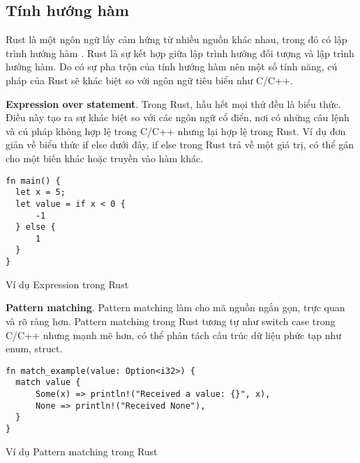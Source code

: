 \subsection{Tính hướng hàm}

Rust là một ngôn ngữ lấy cảm hứng từ nhiều nguồn khác nhau, trong đó có lập trình hướng hàm \cite{hughes1989functional}.
Rust là sự kết hợp giữa lập trình hướng đối tượng và lập trình hướng hàm.
Do có sự pha trộn của tính hướng hàm nên một số tính năng, cú pháp của Rust sẽ khác biệt so với ngôn ngữ tiêu biểu như C/C++.

\textbf{Expression over statement}.
Trong Rust, hầu hết mọi thứ đều là biểu thức.
Điều này tạo ra sự khác biệt so với các ngôn ngữ cổ điển, nơi có những câu lệnh và cú pháp không hợp lệ trong C/C++ nhưng lại hợp lệ trong Rust.
Ví dụ đơn giản về biểu thức if else dưới đây, if else trong Rust trả về một giá trị, có thể gán cho một biến khác hoặc truyền vào hàm khác.

\begin{listing}[H]
\begin{verbatim}
fn main() {
  let x = 5;
  let value = if x < 0 {
      -1
  } else {
      1
  }
}
\end{verbatim}
\caption{Ví dụ Expression trong Rust}
\label{code:fp_expression}
\end{listing}

\textbf{Pattern matching}.
Pattern matching làm cho mã nguồn ngắn gọn, trực quan và rõ ràng hơn. Pattern matching trong Rust tương tự như switch case trong C/C++ nhưng mạnh mẽ hơn, có thể phân tách cấu trúc dữ liệu phức tạp như enum, struct.

\begin{listing}[H]
\begin{verbatim}
fn match_example(value: Option<i32>) {
  match value {
      Some(x) => println!("Received a value: {}", x),
      None => println!("Received None"),
  }
}
\end{verbatim}
\caption{Ví dụ Pattern matching trong Rust}
\label{code:fp_patternmatching}
\end{listing}



